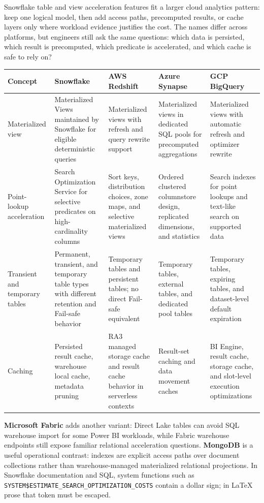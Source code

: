 \begin{crosscloud}
Snowflake table and view acceleration features fit a larger cloud analytics pattern: keep one logical model, then add access paths, precomputed results, or cache layers only where workload evidence justifies the cost. The names differ across platforms, but engineers still ask the same questions: which data is persisted, which result is precomputed, which predicate is accelerated, and which cache is safe to rely on?
\vspace{2mm}
{\footnotesize
\begin{tabular}{@{}p{2.6cm}p{3.0cm}p{3.0cm}p{3.0cm}p{3.0cm}@{}}
\toprule
\textbf{Concept} & \textbf{Snowflake} & \textbf{AWS Redshift} & \textbf{Azure Synapse} & \textbf{GCP BigQuery} \\
\midrule
Materialized view & Materialized Views maintained by Snowflake for eligible deterministic queries & Materialized views with refresh and query rewrite support & Materialized views in dedicated SQL pools for precomputed aggregations & Materialized views with automatic refresh and optimizer rewrite \\
Point-lookup acceleration & Search Optimization Service for selective predicates on high-cardinality columns & Sort keys, distribution choices, zone maps, and selective materialized views & Ordered clustered columnstore design, replicated dimensions, and statistics & Search indexes for point lookups and text-like search on supported data \\
Transient and temporary tables & Permanent, transient, and temporary table types with different retention and Fail-safe behavior & Temporary tables and persistent tables; no direct Fail-safe equivalent & Temporary tables, external tables, and dedicated pool tables & Temporary tables, expiring tables, and dataset-level default expiration \\
Caching & Persisted result cache, warehouse local cache, metadata pruning & RA3 managed storage cache and result cache behavior in serverless contexts & Result-set caching and data movement caches & BI Engine, result cache, storage cache, and slot-level execution optimizations \\
\bottomrule
\end{tabular}}
\vspace{1mm}
\textbf{Microsoft Fabric} adds another variant: Direct Lake tables can avoid SQL warehouse import for some Power BI workloads, while Fabric warehouse endpoints still expose familiar relational acceleration questions. \textbf{MongoDB} is a useful operational contrast: indexes are explicit access paths over document collections rather than warehouse-managed materialized relational projections. In Snowflake documentation and SQL, system functions such as \texttt{SYSTEM\$ESTIMATE\_SEARCH\_OPTIMIZATION\_COSTS} contain a dollar sign; in LaTeX prose that token must be escaped.
\end{crosscloud}
